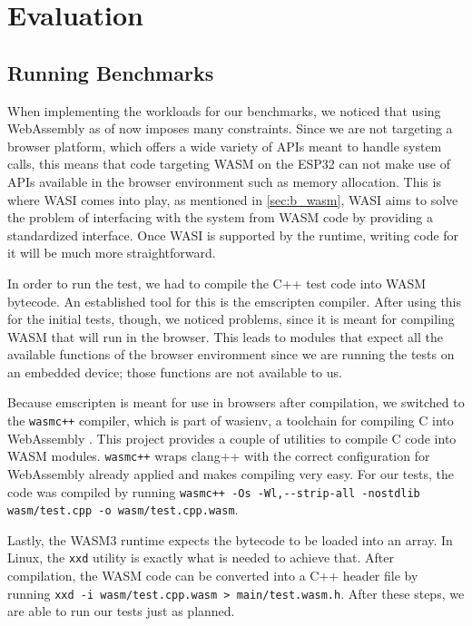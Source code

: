 
\chapter{Evaluation}\label{chapter:evaluation}

\section{Running Benchmarks}

When implementing the workloads for our benchmarks, we noticed that using WebAssembly as of now imposes many constraints. Since we are not targeting a browser platform, which offers a wide variety of APIs meant to handle system calls, this means that code targeting WASM on the ESP32 can not make use of APIs available in the browser environment such as memory allocation. This is where WASI comes into play, as mentioned in \ref{sec:b_wasm}, WASI aims to solve the problem of interfacing with the system from WASM code by providing a standardized interface. Once WASI is supported by the runtime, writing code for it will be much more straightforward.

In order to run the test, we had to compile the C++ test code into WASM bytecode. An established tool for this is the emscripten compiler. After using this for the initial tests, though, we noticed problems, since it is meant for compiling WASM that will run in the browser. This leads to modules that expect all the available functions of the browser environment since we are running the tests on an embedded device; those functions are not available to us.

Because emscripten is meant for use in browsers after compilation, we switched to the \lstinline{wasmc++} compiler, which is part of wasienv, a toolchain for compiling C into WebAssembly \autocite{noauthor_wasienvwasienv_2020}. This project provides a couple of utilities to compile C code into WASM modules. \lstinline{wasmc++} wraps clang++ with the correct configuration for WebAssembly already applied and makes compiling very easy. For our tests, the code was compiled by running \lstinline{wasmc++ -Os -Wl,--strip-all -nostdlib wasm/test.cpp -o wasm/test.cpp.wasm}.

\begin{sloppypar}
Lastly, the WASM3 runtime expects the bytecode to be loaded into an array. In Linux, the \lstinline{xxd} utility is exactly what is needed to achieve that. After compilation, the WASM code can be converted into a C++ header file by running \lstinline{xxd -i wasm/test.cpp.wasm > main/test.wasm.h}. After these steps, we are able to run our tests just as planned.
\end{sloppypar}

